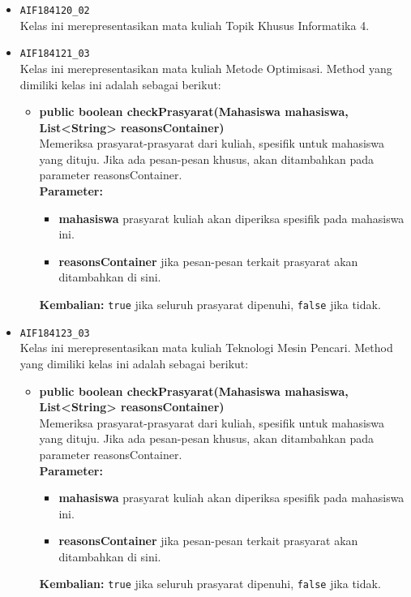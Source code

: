 \begin{enumerate}
\begin{itemize}
\begin{itemize}
		\end{itemize}
		\item \texttt{AIF184120\_02} \\
		Kelas ini merepresentasikan mata kuliah Topik Khusus Informatika 4.
		\item \texttt{AIF184121\_03} \\
		Kelas ini merepresentasikan mata kuliah Metode Optimisasi. Method yang dimiliki kelas ini adalah sebagai berikut: 
		\begin{itemize}
			\item \textbf{public boolean checkPrasyarat(Mahasiswa mahasiswa, List<String> reasonsContainer)}\\
			Memeriksa prasyarat-prasyarat dari kuliah, spesifik untuk mahasiswa yang dituju. Jika ada pesan-pesan khusus, akan ditambahkan pada parameter reasonsContainer.\\
			\textbf{Parameter:}
			\begin{itemize}
				\item \textbf{mahasiswa} prasyarat kuliah akan diperiksa spesifik pada mahasiswa ini.
				\item \textbf{reasonsContainer} jika pesan-pesan terkait prasyarat akan ditambahkan di sini.
			\end{itemize}
			\textbf{Kembalian:} \texttt{true} jika seluruh prasyarat dipenuhi, \texttt{false} jika tidak.
		\end{itemize}
		\item \texttt{AIF184123\_03} \\
		Kelas ini merepresentasikan mata kuliah Teknologi Mesin Pencari. Method yang dimiliki kelas ini adalah sebagai berikut: 
		\begin{itemize}
			\item \textbf{public boolean checkPrasyarat(Mahasiswa mahasiswa, List<String> reasonsContainer)}\\
			Memeriksa prasyarat-prasyarat dari kuliah, spesifik untuk mahasiswa yang dituju. Jika ada pesan-pesan khusus, akan ditambahkan pada parameter reasonsContainer.\\
			\textbf{Parameter:}
			\begin{itemize}
				\item \textbf{mahasiswa} prasyarat kuliah akan diperiksa spesifik pada mahasiswa ini.
				\item \textbf{reasonsContainer} jika pesan-pesan terkait prasyarat akan ditambahkan di sini.
			\end{itemize}
			\textbf{Kembalian:} \texttt{true} jika seluruh prasyarat dipenuhi, \texttt{false} jika tidak.

\end{itemize}
\end{itemize}
\end{enumerate}
